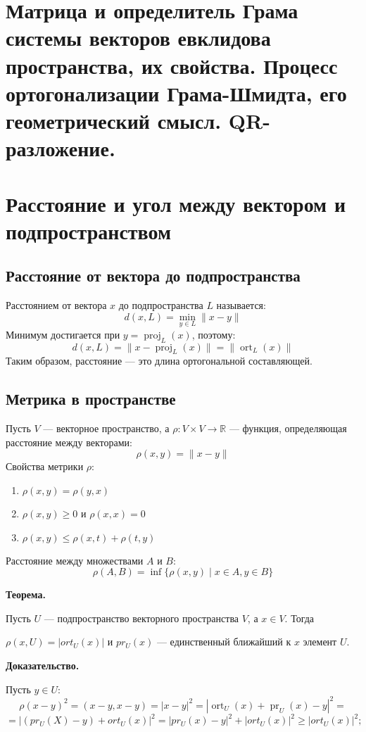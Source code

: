 \documentclass[12pt]{article}
\begin{document}
\section{Матрица и определитель Грама системы векторов евклидова пространства, их свойства. Процесс ортогонализации Грама-Шмидта, его геометрический смысл. QR-разложение.}

\section{Расстояние и угол между вектором и подпространством}

\subsection{Расстояние от вектора до подпространства}
Расстоянием от вектора $x$ до подпространства $L$ называется:
\[
d(x, L) = \min_{y \in L} \|x - y\|
\]
Минимум достигается при $y = \operatorname{proj}_L(x)$, поэтому:
\[
d(x, L) = \|x - \operatorname{proj}_L(x)\| = \|\operatorname{ort}_L(x)\|
\]
Таким образом, расстояние — это длина ортогональной составляющей.

\subsection{Метрика в пространстве}
Пусть $V$ — векторное пространство, а $\rho: V \times V \to \mathbb{R}$ — функция, определяющая расстояние между векторами:
\[
\rho(x, y) = \|x - y\|
\]
Свойства метрики $\rho$:
\begin{enumerate}
    \item $\rho(x, y) = \rho(y, x)$
    \item $\rho(x, y) \geq 0$ и $\rho(x, x) = 0$
    \item $\rho(x, y) \leq \rho(x, t) + \rho(t, y)$
\end{enumerate}
Расстояние между множествами $A$ и $B$:
\[
\rho(A, B) = \inf \{ \rho(x, y) \mid x \in A, y \in B \}
\]

\textbf{Теорема.}

Пусть \( U \) — подпространство векторного пространства \( V \), а \( x \in V \). Тогда

$\rho (x, U) = |ort_U(x)|$ и $pr_U(x)$ — единственный ближайший к $x$ элемент $U$.

\textbf{Доказательство.}

Пусть $y \in U$:
\[
\rho (x - y)^2 = (x - y, x-y) = |x-y|^2 = |\operatorname{ort}_U(x) + \operatorname{pr}_U(x) - y|^2 = 
\]
\[
= |(pr_U(X) - y) + ort_U(x)|^2 = |pr_U(x) - y|^2 + |ort_U(x)|^2 \geq |ort_U(x)|^2; 
\]
\end{document}
